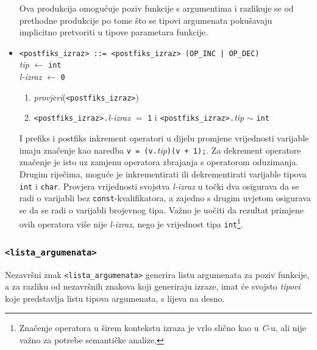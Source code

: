 \documentclass[times, 12pt, utf8]{book}
\begin{document}
\begin{itemize}
Ova produkcija omogućuje poziv funkcije s argumentima i razlikuje se od prethodne produkcije po tome što se tipovi argumenata pokušavaju implicitno pretvoriti u tipove parametara funkcije.

\item
\verb#<postfiks_izraz> ::= <postfiks_izraz> (OP_INC | OP_DEC)#\\
\emph{tip} \(\leftarrow\) \verb|int|\\
\emph{l-izraz} \(\leftarrow\) \verb|0|
\begin{enumerate}
\item
\emph{provjeri}(\verb|<postfiks_izraz>|)
\item
\verb|<postfiks_izraz>.|\emph{l-izraz} \(=\) \verb|1| i \verb|<postfiks_izraz>.|\emph{tip} \(\sim\) \verb|int|
\end{enumerate}

I prefiks i postfiks inkrement operatori u dijelu promjene vrijednosti varijable imaju značenje kao naredba \verb|v = (v.|\emph{tip}\verb|)(v + 1);|.
Za dekrement operatore značenje je isto uz zamjenu operatora zbrajanja s operatorom oduzimanja.
Drugim riječima, moguće je inkrementirati ili dekrementirati varijable tipova \verb|int| i \verb|char|.
Provjera vrijednosti svojstva \emph{l-izraz} u točki dva osigurava da se radi o varijabli bez \verb|const|-kvalifikatora, a zajedno s drugim uvjetom osigurava se da se radi o varijabli brojevnog tipa.
Važno je uočiti da rezultat primjene ovih operatora više nije \emph{l-izraz}, nego je vrijednost tipa \verb|int|\footnote{Značenje operatora u širem kontekstu izraza je vrlo slično kao u \emph{C}-u, ali nije važno za potrebe semantičke analize.}.

\end{itemize}

\subsubsection{\texttt{<lista\_argumenata>}}

Nezavršni znak \verb|<lista_argumenata>| generira listu argumenata za poziv funkcije, a za razliku od nezavršnih znakova koji generiraju izraze, imat će svojsto \emph{tipovi} koje predstavlja listu tipova argumenata, s lijeva na desno.
\end{document}
